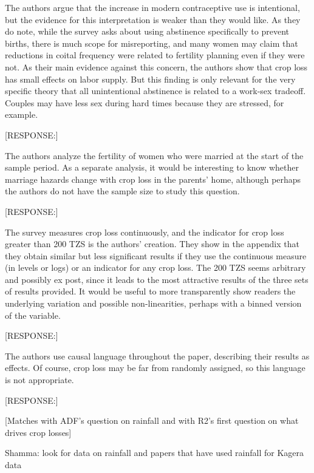 \documentclass[letterpaper,12pt]{article}
\begin{document}
\begin{description}
\item The authors argue that the increase in modern contraceptive use is
intentional, but the evidence for this interpretation is weaker than
they would like. As they do note, while the survey asks about using
abstinence specifically to prevent births, there is much scope for
misreporting, and many women may claim that reductions in coital
frequency were related to fertility planning even if they were not. As
their main evidence against this concern, the authors show that crop
loss has small effects on labor supply. But this finding is only
relevant for the very specific theory that all unintentional abstinence
is related to a work-sex tradeoff. Couples may have less sex during hard
times because they are stressed, for example.

[RESPONSE:]

\item The authors analyze the fertility of women who were married at the
start of the sample period. As a separate analysis, it would be
interesting to know whether marriage hazards change with crop loss in
the parents' home, although perhaps the authors do not have the sample
size to study this question.

[RESPONSE:]

\item The survey measures crop loss continuously, and the indicator for
crop loss greater than 200 TZS is the authors' creation. They show in
the appendix that they obtain similar but less significant results if
they use the continuous measure (in levels or logs) or an indicator for
any crop loss. The 200 TZS seems arbitrary and possibly ex post, since
it leads to the most attractive results of the three sets of results
provided. It would be useful to more transparently show readers the
underlying variation and possible non-linearities, perhaps with a binned
version of the variable.

[RESPONSE:]

\item The authors use causal language throughout the paper, describing
their results as effects. Of course, crop loss may be far from randomly
assigned, so this language is not appropriate.

[RESPONSE:]

[Matches with ADF's question on rainfall and with R2's first question 
on what drives crop losses]

Shamma: look for data on rainfall and papers that have used rainfall
for Kagera data


\end{description}
\end{document}
